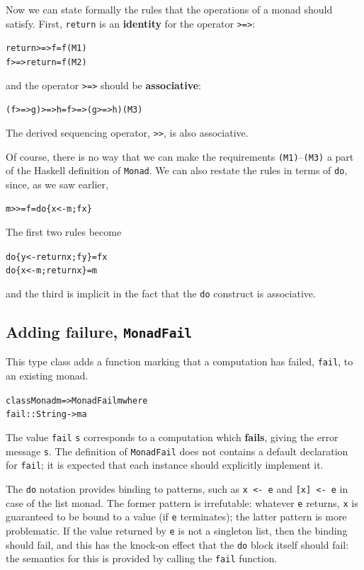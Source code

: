Now we can state formally the rules that the operations of
a monad should satisfy. 
First,
\texttt{return} is an \textbf{identity} for the operator \texttt{>=>}:
\begin{alltt}
return >=> f = f\hfill(M1)
f >=> return = f\hfill(M2)
\end{alltt}
and the operator \texttt{>=>} should be \textbf{associative}:
\begin{alltt}
(f >=> g) >=> h = f >=> (g >=> h)\hfill (M3)
\end{alltt}
The derived sequencing operator, \texttt{>>}\minx{>>}, is also associative.

Of course, there is no way that we can make the requirements \texttt{(M1)}--\texttt{(M3)} 
a part of
the Haskell definition of \texttt{Monad}. 
We can also restate the rules in terms of
\texttt{do}, since, as we saw earlier,
\begin{alltt}
m >>= f  =  do \{ x <- m; f x \}
\end{alltt}
The first two rules become
\begin{alltt}
do \{ y <- return x; f y \} =  f x
do \{ x <- m; return x \}   =  m
\end{alltt}
and the third is implicit in the fact that the \texttt{do}
construct is associative.

\subsection*{Adding failure, \texttt{MonadFail}}
This type class adds a function marking that a computation has failed, \texttt{fail}, to an existing monad.
\begin{alltt}
class Monad m => MonadFail m where
  fail   :: String -> m a
\end{alltt}
The value \texttt{fail} \texttt{s} corresponds to a computation which
\textbf{fails}, giving the error message \texttt{s}. The definition of \texttt{MonadFail} does not contains a default declaration for \texttt{fail}; it is expected that each instance should explicitly implement it. 

The \texttt{do} notation provides binding to patterns, such as \texttt{x <- e} and \texttt{[x] <- e} in case of the list monad. The former pattern is irrefutable: whatever \texttt{e} returns, \texttt{x} is guaranteed to be bound to a value (if \texttt{e} terminates); the latter pattern is more problematic. If the value returned by \texttt{e} is not a singleton list, then the binding should fail, and this has the knock-on effect that the  \texttt{do} block itself should fail: the semantics for this is provided by calling the \texttt{fail} function.


